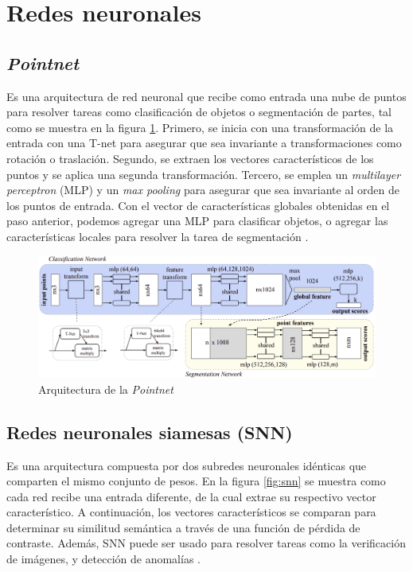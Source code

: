 \section{Redes neuronales}
\subsection{\textit{Pointnet}}
Es una arquitectura de red neuronal que recibe como entrada una nube de puntos para resolver tareas como clasificación de objetos o segmentación de partes, tal como se muestra en la figura \ref{fig:pointnet}. Primero, se inicia con una transformación de la entrada con una T-net para asegurar que sea invariante a transformaciones como rotación o traslación. Segundo, se extraen los vectores característicos de los puntos y se aplica una segunda transformación. Tercero, se emplea un \textit{multilayer perceptron} (MLP) y un \textit{max pooling} para asegurar que sea invariante al orden de los puntos de entrada. Con el vector de características globales obtenidas en el paso anterior, podemos agregar una MLP para clasificar objetos, o agregar las características locales para resolver la tarea de segmentación \cite{14}.

\begin{figure}[!h]
    \centering
     \includegraphics[scale=0.19]{images/pointnet.png}
    \caption{Arquitectura de la \textit{Pointnet} \cite{14}}
    \label{fig:pointnet}
\end{figure}

\subsection{Redes neuronales siamesas (SNN)}
Es una arquitectura compuesta por dos subredes neuronales idénticas que comparten el mismo conjunto de pesos. En la figura \ref{fig:snn} se muestra como cada red recibe una entrada diferente, de la cual extrae su respectivo vector característico. A continuación, los vectores característicos se comparan para determinar su similitud semántica a través de una función de pérdida de contraste. Además, SNN puede ser usado para resolver tareas como la verificación de imágenes, y detección de anomalías \cite{15}. 


